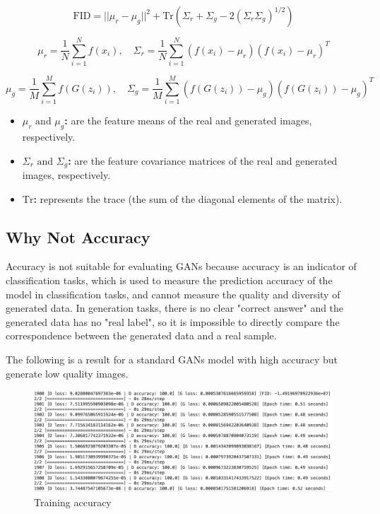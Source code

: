 \begin{equation}
    \text{FID} = || \mu_r - \mu_g ||^2 + \text{Tr}(\Sigma_r + \Sigma_g - 2(\Sigma_r \Sigma_g)^{1/2})
\end{equation}


\begin{equation}
    \mu_r = \frac{1}{N} \sum_{i=1}^{N} f(x_i), \quad \Sigma_r = \frac{1}{N} \sum_{i=1}^{N} (f(x_i) - \mu_r)(f(x_i) - \mu_r)^T
\end{equation}

\begin{equation}
    \mu_g = \frac{1}{M} \sum_{i=1}^{M} f(G(z_i)), \quad \Sigma_g = \frac{1}{M} \sum_{i=1}^{M} (f(G(z_i)) - \mu_g)(f(G(z_i)) - \mu_g)^T
\end{equation}


\begin{itemize}
    \item \textbf{ $\mu_r \text{ and } \mu_g$:}  are the feature means of the real and generated images, respectively.
    \item \textbf{$\Sigma_r \text{ and } \Sigma_g$:}  are the feature covariance matrices of the real and generated images, respectively.
    \item \textbf{ $\text{Tr}$:}  represents the trace (the sum of the diagonal elements of the matrix).
\end{itemize}


\subsection*{Why Not Accuracy}

Accuracy is not suitable for evaluating GANs because accuracy is an indicator of classification tasks, 
which is used to measure the prediction accuracy of the model in classification tasks, and cannot 
measure the quality and diversity of generated data. In generation tasks, there is no clear 
"correct answer" and the generated data has no "real label", so it is impossible to directly 
compare the correspondence between the generated data and a real sample. 

The following is a result for a standard GANs model with high accuracy but generate low quality images.


\begin{figure}[H]
    \centering
    \includegraphics[width=1.2\linewidth]{./Images/model_accuracy.jpg}
    \caption{Training accuracy}
    \label{fig:my_picture}
\end{figure}

